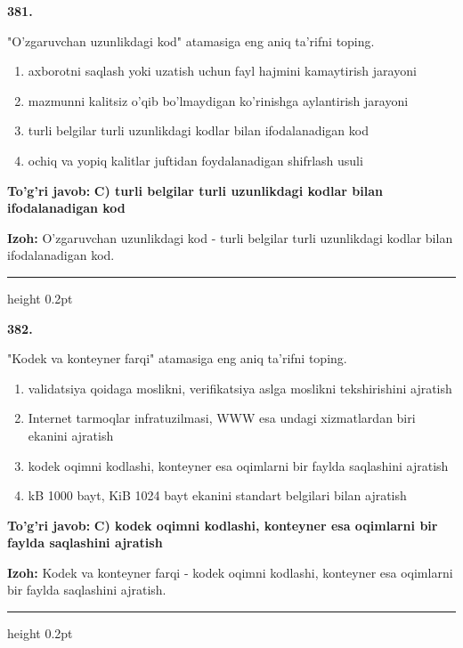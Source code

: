 \documentclass[10pt,a4paper,oneside]{article}
\begin{document}
\noindent\textbf{\color{ink}381.}
\par
"O'zgaruvchan uzunlikdagi kod" atamasiga eng aniq ta'rifni toping.
\begin{enumerate}[label=\Alph*),leftmargin=9mm]
\item axborotni saqlash yoki uzatish uchun fayl hajmini kamaytirish jarayoni
\item mazmunni kalitsiz o'qib bo'lmaydigan ko'rinishga aylantirish jarayoni
\item turli belgilar turli uzunlikdagi kodlar bilan ifodalanadigan kod
\item ochiq va yopiq kalitlar juftidan foydalanadigan shifrlash usuli
\end{enumerate}
\begin{tcolorbox}[enhanced,breakable,colback=teal!4,colframe=teal!50!black,boxrule=0.5pt,arc=1.1mm,left=3mm,right=3mm,top=1.7mm,bottom=1.7mm,before skip=2mm,after skip=2mm]
\textbf{\color{teal}To'g'ri javob:} \textbf{C) turli belgilar turli uzunlikdagi kodlar bilan ifodalanadigan kod}
\par\smallskip
\textbf{Izoh:} O'zgaruvchan uzunlikdagi kod - turli belgilar turli uzunlikdagi kodlar bilan ifodalanadigan kod.
\end{tcolorbox}
\vspace{2mm}\hrule height 0.2pt \vspace{3mm}

\noindent\textbf{\color{ink}382.}
\par
"Kodek va konteyner farqi" atamasiga eng aniq ta'rifni toping.
\begin{enumerate}[label=\Alph*),leftmargin=9mm]
\item validatsiya qoidaga moslikni, verifikatsiya aslga moslikni tekshirishini ajratish
\item Internet tarmoqlar infratuzilmasi, WWW esa undagi xizmatlardan biri ekanini ajratish
\item kodek oqimni kodlashi, konteyner esa oqimlarni bir faylda saqlashini ajratish
\item kB 1000 bayt, KiB 1024 bayt ekanini standart belgilari bilan ajratish
\end{enumerate}
\begin{tcolorbox}[enhanced,breakable,colback=teal!4,colframe=teal!50!black,boxrule=0.5pt,arc=1.1mm,left=3mm,right=3mm,top=1.7mm,bottom=1.7mm,before skip=2mm,after skip=2mm]
\textbf{\color{teal}To'g'ri javob:} \textbf{C) kodek oqimni kodlashi, konteyner esa oqimlarni bir faylda saqlashini ajratish}
\par\smallskip
\textbf{Izoh:} Kodek va konteyner farqi - kodek oqimni kodlashi, konteyner esa oqimlarni bir faylda saqlashini ajratish.
\end{tcolorbox}
\vspace{2mm}\hrule height 0.2pt \vspace{3mm}
\end{document}
